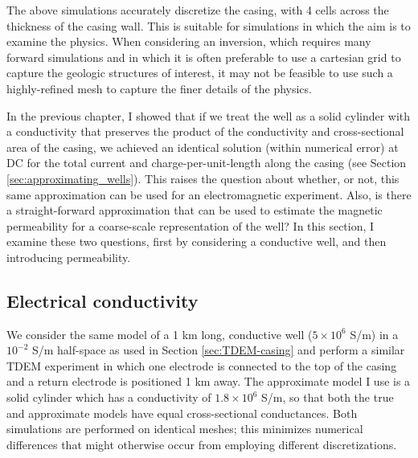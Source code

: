 The above simulations accurately discretize the casing, with 4 cells across the thickness of the casing wall. This is suitable for simulations in which the aim is to examine the physics. When considering an inversion, which requires many forward simulations and in which it is often preferable to use a cartesian grid to capture the geologic structures of interest, it may not be feasible to use such a highly-refined mesh to capture the finer details of the physics.

In the previous chapter, I showed that if we treat the well as a solid cylinder with a conductivity that preserves the product of the conductivity and cross-sectional area of the casing, we achieved an identical solution (within numerical error) at DC for the total current and charge-per-unit-length along the casing (see Section \ref{sec:approximating_wells}). This raises the question about whether, or not, this same approximation can be used for an electromagnetic experiment. Also, is there a straight-forward approximation that can be used to estimate the magnetic permeability for a coarse-scale representation of the well? In this section, I examine these two questions, first by considering a conductive well, and then introducing permeability.
\subsection{Electrical conductivity}
We consider the same model of a 1 km long, conductive well ($5 \times 10^6$ S/m) in a $10^{-2}$ S/m half-space as used in Section \ref{sec:TDEM-casing} and perform a similar TDEM experiment in which one electrode is connected to the top of the casing and a return electrode is positioned 1 km away. The approximate model I use is a solid cylinder which has a conductivity of $1.8 \times 10^6$ S/m, so that both the true and approximate models have equal cross-sectional conductances. Both simulations are performed on identical meshes; this minimizes numerical differences that might otherwise occur from employing different discretizations.

